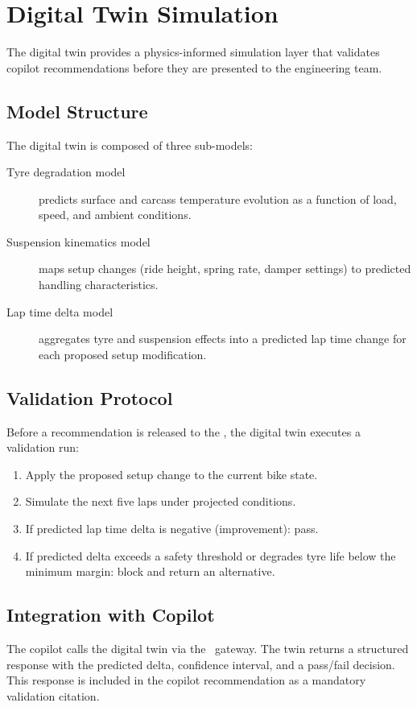 \section{Digital Twin Simulation}
\label{sec:digital-twin}

The digital twin provides a physics-informed simulation layer that validates
copilot recommendations before they are presented to the engineering team.

\subsection{Model Structure}

The digital twin is composed of three sub-models:

\begin{description}
  \item[Tyre degradation model] predicts surface and carcass temperature
    evolution as a function of load, speed, and ambient conditions.
  \item[Suspension kinematics model] maps setup changes (ride height, spring
    rate, damper settings) to predicted handling characteristics.
  \item[Lap time delta model] aggregates tyre and suspension effects into a
    predicted lap time change for each proposed setup modification.
\end{description}

\subsection{Validation Protocol}

Before a recommendation is released to the \rcc, the digital twin executes a
validation run:

\begin{enumerate}
  \item Apply the proposed setup change to the current bike state.
  \item Simulate the next five laps under projected conditions.
  \item If predicted lap time delta is negative (improvement): pass.
  \item If predicted delta exceeds a safety threshold or degrades tyre life
    below the minimum margin: block and return an alternative.
\end{enumerate}

\subsection{Integration with Copilot}

The copilot calls the digital twin via the \mcp~gateway. The twin returns a
structured response with the predicted delta, confidence interval, and a
pass/fail decision. This response is included in the copilot recommendation
as a mandatory validation citation.

